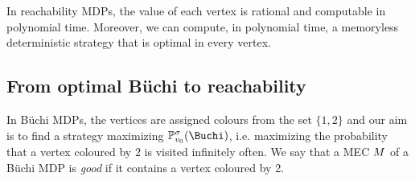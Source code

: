 \begin{theorem}
\label{5-thm:quant-reachability-main}
In reachability MDPs, the value of each vertex is rational and computable in polynomial time. Moreover, we can compute, in polynomial time, a memoryless deterministic strategy that is optimal in every vertex.
\end{theorem}

\subsection*{From optimal B\"uchi to reachability}


In B\"uchi MDPs, the vertices are assigned colours from the set $\{1,2\}$ and our aim is to find a strategy maximizing $ \probm^\sigma_{\vinit}(\Buchi)$, i.e. maximizing the probability that a vertex coloured by $2$ is visited infinitely often.
We say that a MEC $M$ of a B\"uchi MDP is \emph{good} if it contains a vertex coloured by 2.

